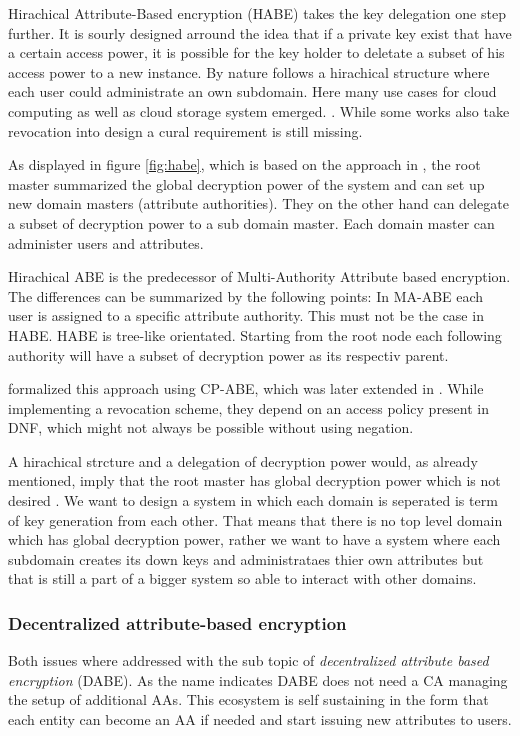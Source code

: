 Hirachical Attribute-Based encryption (\ac{HABE}) takes the key delegation one step further. It is sourly designed arround the idea that if a private key exist that have a certain access power, it is possible for the key holder to deletate a subset of his access power to a new instance. By nature follows a hirachical structure where each user could administrate an own subdomain. Here many use cases for cloud computing as well as cloud storage system emerged. \cite{Wang:2010:HAE:1866307.1866414}. While some works also take revocation into design a cural requirement is still missing.

As displayed in figure \ref{fig:habe}, which is based on the approach in \cite{wang2011hierarchical}, the root master summarized the global decryption power of the system and can set up new domain masters (attribute authorities). They on the other hand can delegate a subset of decryption power to a sub domain master. Each domain master can administer users and attributes.

Hirachical \ac{ABE} is the predecessor of Multi-Authority Attribute based encryption. The differences can be summarized by the following points: In \ac{MA-ABE} each user is assigned to a specific attribute authority. This must not be the case in \ac{HABE}. \ac{HABE} is tree-like orientated. Starting from the root node each following authority will have a subset of decryption power as its respectiv parent. 

\cite{Wang:2010:HAE:1866307.1866414} formalized this approach using \ac{CP-ABE}, which was later extended in \cite{wang2011hierarchical}. While implementing a revocation scheme, they depend on an access policy present in \ac{DNF}, which might not always be possible without using negation. 

A hirachical strcture and a delegation of decryption power would, as already mentioned, imply that the root master has global decryption power which is not desired . We want to design a system in which each domain is seperated is term of key generation from each other. That means that there is no top level domain which has global decryption power, rather we want to have a system where each subdomain creates its down keys and administrataes thier own attributes but that is still a part of a bigger system so able to interact with other domains.  

\subsubsection{Decentralized attribute-based encryption}
\label{sec:DABE}
Both issues where addressed with the sub topic of \textit{decentralized attribute based encryption} (\ac{DABE}). As the name indicates \ac{DABE} does not need a \ac{CA} managing the setup of additional \ac{AA}s. This ecosystem is self sustaining in the form that each entity can become an \ac{AA} if needed and start issuing new attributes to users. 

